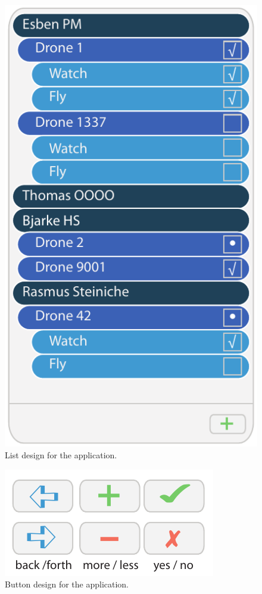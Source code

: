 \begin{figure}[htb]
    \centering
    \includegraphics[scale=1.0]{gfx/list.pdf}
    \caption{List design for the application.}
    \label{fig:list_design}
\end{figure}

\begin{figure}[htb]
    \centering
    \includegraphics[scale=1.0]{gfx/button.pdf}
    \caption{Button design for the application.}
    \label{fig:button_design}
\end{figure}